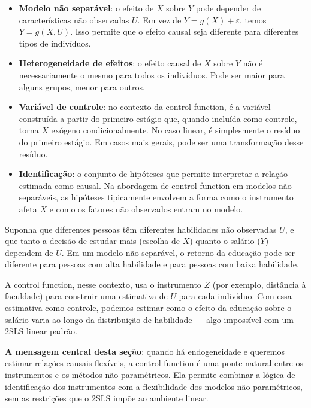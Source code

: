\begin{itemize}
  \item \textbf{Modelo não separável}: o efeito de $X$ sobre $Y$ pode depender de
  características não observadas $U$. Em vez de $Y = g(X) + \varepsilon$, temos
  $Y = g(X, U)$. Isso permite que o efeito causal seja diferente para diferentes
  tipos de indivíduos.

  \item \textbf{Heterogeneidade de efeitos}: o efeito causal de $X$ sobre $Y$ não é
  necessariamente o mesmo para todos os indivíduos. Pode ser maior para alguns grupos,
  menor para outros.

  \item \textbf{Variável de controle}: no contexto da control function, é a variável
  construída a partir do primeiro estágio que, quando incluída como controle, torna
  $X$ exógeno condicionalmente. No caso linear, é simplesmente o resíduo do primeiro
  estágio. Em casos mais gerais, pode ser uma transformação desse resíduo.

  \item \textbf{Identificação}: o conjunto de hipóteses que permite interpretar a
  relação estimada como causal. Na abordagem de control function em modelos não
  separáveis, as hipóteses tipicamente envolvem a forma como o instrumento afeta
  $X$ e como os fatores não observados entram no modelo.
\end{itemize}

\begin{exemplobox}
Suponha que diferentes pessoas têm diferentes habilidades não observadas $U$, e que
tanto a decisão de estudar mais (escolha de $X$) quanto o salário ($Y$) dependem de
$U$. Em um modelo não separável, o retorno da educação pode ser diferente para pessoas
com alta habilidade e para pessoas com baixa habilidade.

A control function, nesse contexto, usa o instrumento $Z$ (por exemplo, distância à
faculdade) para construir uma estimativa de $U$ para cada indivíduo. Com essa
estimativa como controle, podemos estimar como o efeito da educação sobre o salário
varia ao longo da distribuição de habilidade --- algo impossível com um 2SLS linear
padrão.
\end{exemplobox}

\textbf{A mensagem central desta seção}: quando há endogeneidade e queremos estimar
relações causais flexíveis, a control function é uma ponte natural entre os instrumentos
e os métodos não paramétricos. Ela permite combinar a lógica de identificação dos
instrumentos com a flexibilidade dos modelos não paramétricos, sem as restrições que
o 2SLS impõe ao ambiente linear.

